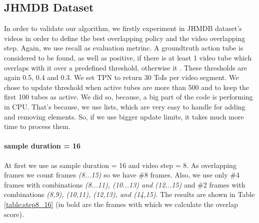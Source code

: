 \documentclass{report}
\begin{document}
\subsection{JHMDB Dataset}

In order to validate our algorithm, we firstly experiment in JHMDB dataset's videos in order to define the best overlapping policy and
the video overlapping step. Again, we use recall as evaluation metrinc. A groundtruth action tube is considered to be found, as well as positive,
if there is at least 1 video tube which overlaps with it over a predefined threshold, otherwise it .  These thresholds are again 0.5, 0.4 and 0.3.
We set TPN to return 30 ToIs per video segment.
We chose to update threshold when active tubes are more than 500 and to keep the first 100 tubes as active. We did so, because, a big part of the
code is performing in CPU. That's because, we use lists, which are very easy to handle for adding and removing elements. So, if we use bigger update
limits, it takes much more time to process them.

\paragraph{sample duration = 16} At first we use as sample duration = 16 and video step = 8. As overlapping frames we count frames
\textit{(8...15)} so we have \#8 frames. Also, we use only \#4 frames with combinations \textit{(8...11), (10...13) and (12...15)} and 
\#2 frames with combinations \textit{(8,9), (10,11), (12,13), and (14,15)}. The results are shown in Table \ref{table:step8_16} (in bold are
the frames with which we calculate the overlap score).
\end{document}
